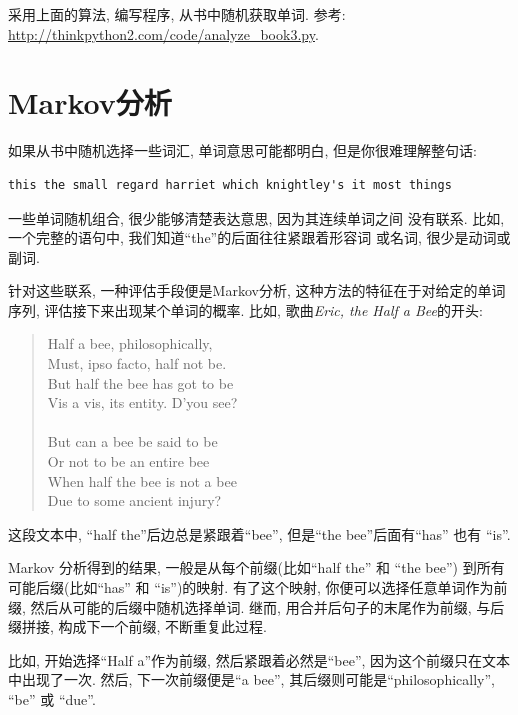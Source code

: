\documentclass[10pt]{book}
\begin{document}
\begin{exercise}
\label{randhist}

采用上面的算法, 编写程序, 从书中随机获取单词. 参考:
\url{http://thinkpython2.com/code/analyze_book3.py}.

\end{exercise}



\section{Markov分析}
\label{markov}
如果从书中随机选择一些词汇, 单词意思可能都明白, 
但是你很难理解整句话:

\begin{verbatim}
this the small regard harriet which knightley's it most things
\end{verbatim}
%
一些单词随机组合, 很少能够清楚表达意思, 因为其连续单词之间
没有联系. 比如, 一个完整的语句中, 我们知道``the''的后面往往紧跟着形容词
或名词, 很少是动词或副词. 

针对这些联系, 一种评估手段便是Markov分析, 这种方法的特征在于对给定的单词序列, 
评估接下来出现某个单词的概率. 比如, 歌曲{\em Eric, the Half a Bee}的开头:

\begin{quote}
Half a bee, philosophically, \\
Must, ipso facto, half not be. \\
But half the bee has got to be \\
Vis a vis, its entity. D'you see? \\
\\
But can a bee be said to be \\
Or not to be an entire bee \\
When half the bee is not a bee \\
Due to some ancient injury? \\
\end{quote}
%
这段文本中, ``half the''后边总是紧跟着``bee'',
但是``the bee''后面有``has'' 也有 ``is''.

Markov 分析得到的结果, 一般是从每个前缀(比如``half the'' 和 ``the bee'')
到所有可能后缀(比如``has'' 和 ``is'')的映射.
有了这个映射, 你便可以选择任意单词作为前缀, 
然后从可能的后缀中随机选择单词. 继而, 用合并后句子的末尾作为前缀, 与后缀拼接, 
构成下一个前缀, 不断重复此过程. 

比如, 开始选择``Half a''作为前缀, 然后紧跟着必然是``bee'', 
因为这个前缀只在文本中出现了一次. 然后, 下一次前缀便是``a bee'', 
其后缀则可能是``philosophically'', ``be'' 或 ``due''.
\end{document}
